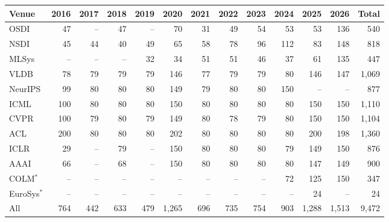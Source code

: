 \begin{tabular}{l rrrrrrrrrrr r}
\toprule
Venue & 2016 & 2017 & 2018 & 2019 & 2020 & 2021 & 2022 & 2023 & 2024 & 2025 & 2026 & Total \\
\midrule
OSDI & 47 & -- & 47 & -- & 70 & 31 & 49 & 54 & 53 & 53 & 136 & 540 \\
NSDI & 45 & 44 & 40 & 49 & 65 & 58 & 78 & 96 & 112 & 83 & 148 & 818 \\
MLSys & -- & -- & -- & 32 & 34 & 51 & 51 & 46 & 37 & 61 & 135 & 447 \\
VLDB & 78 & 79 & 79 & 79 & 146 & 77 & 79 & 79 & 80 & 146 & 147 & 1,069 \\
NeurIPS & 99 & 80 & 80 & 80 & 149 & 79 & 80 & 80 & 150 & -- & -- & 877 \\
ICML & 100 & 80 & 80 & 80 & 150 & 80 & 80 & 80 & 80 & 150 & 150 & 1,110 \\
CVPR & 100 & 79 & 80 & 79 & 149 & 80 & 78 & 79 & 80 & 150 & 150 & 1,104 \\
ACL & 200 & 80 & 80 & 80 & 202 & 80 & 80 & 80 & 80 & 200 & 198 & 1,360 \\
ICLR & 29 & -- & 79 & -- & 150 & 80 & 80 & 80 & 79 & 149 & 150 & 876 \\
AAAI & 66 & -- & 68 & -- & 150 & 80 & 80 & 80 & 80 & 147 & 149 & 900 \\
COLM$^*$ & -- & -- & -- & -- & -- & -- & -- & -- & 72 & 125 & 150 & 347 \\
EuroSys$^*$ & -- & -- & -- & -- & -- & -- & -- & -- & -- & 24 & -- & 24 \\
\midrule
All & 764 & 442 & 633 & 479 & 1,265 & 696 & 735 & 754 & 903 & 1,288 & 1,513 & 9,472 \\
\bottomrule
\end{tabular}
